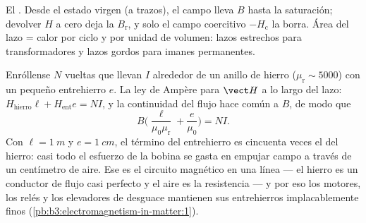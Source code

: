 \begin{omfigure}

{\small El . Desde el estado virgen (a trazos), el
campo lleva $B$ hasta la saturación; devolver $H$ a cero deja la
 $B_{\text{r}}$, y solo el campo coercitivo
$-H_{\text{c}}$ la borra. Área del lazo = calor por ciclo y por unidad de
volumen: lazos estrechos para transformadores y lazos gordos para imanes
permanentes.}
\end{omfigure}

\begin{example}\label{ex:b3:electromagnetism-in-matter:electromagnet}
Enróllense $N$ vueltas que llevan $I$ alrededor de un anillo de hierro ($\mu_{\text{r}}
\sim 5000$) con un pequeño entrehierro $e$. La ley de Ampère para $\vect H$
a lo largo del lazo: $H_{\text{hierro}}\ell + H_{\text{ent}}e = NI$, y
la continuidad del flujo hace común a $B$, de modo que
\[
B\Big(\frac{\ell}{\mu_0\mu_{\text{r}}} + \frac{e}{\mu_0}\Big) = NI .
\]
Con $\ell = \qty{1}{m}$ y $e = \qty{1}{cm}$, el término del entrehierro es
cincuenta veces el del hierro: casi todo el esfuerzo de la bobina se gasta
en empujar campo a través de un centímetro de aire. Ese es el circuito
magnético en una línea --- el hierro es un conductor de flujo casi perfecto
y el aire es la resistencia --- y por eso los motores, los relés y los
elevadores de desguace mantienen sus entrehierros implacablemente finos
(\cref{pb:b3:electromagnetism-in-matter:1}).
\end{example}

